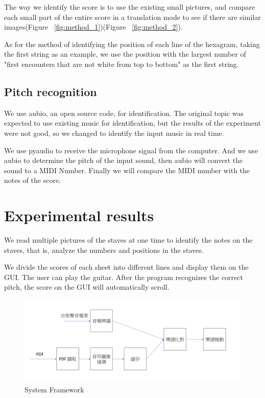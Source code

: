 \documentclass[10pt,twocolumn,letterpaper]{article}
\begin{document}
\begin{CJK}{UTF8}{bsmi}
The way we identify the score is to use the existing small pictures, and compare each small part of the entire score in a translation mode to see if there are similar images(Figure ~\ref{fig:method_1})(Figure ~\ref{fig:method_2}).

As for the method of identifying the position of each line of the hexagram, taking the first string as an example, we use the position with the largest number of "first encounters that are not white from top to bottom" as the first string.

\subsection{Pitch recognition}

We use aubio\cite{aubio_cite}, an open source code, for identification. The original topic was expected to use existing music for identification, but the results of the experiment were not good, so we changed to identify the input music in real time.

We use pyaudio\cite{pyaudio_cite} to receive the microphone signal from the computer. 
And we use aubio to determine the pitch of the input sound, then aubio will convert the sound to a MIDI Number.
Finally we will compare the MIDI number with the notes of the score.

\section{Experimental results}


We read multiple pictures of the staves at one time to identify the notes on the staves, that is, analyze the numbers and positions in the staves.

We divide the scores of each sheet into different lines and display them on the GUI. The user can play the guitar. After the program recognizes the correct pitch, the score on the GUI will automatically scroll.

\begin{figure}[t]
\begin{center}
   \includegraphics[width=0.8\linewidth]{system_framework.png}
\end{center}
   \caption{System Framework}
\label{fig:long}
\label{fig:system_framework}
\end{figure}


\end{CJK}
\end{document}
